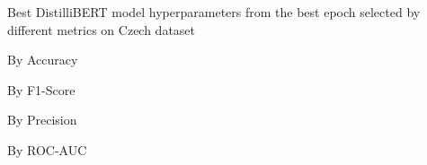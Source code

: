 \begin{table}[!htbp]
    \caption{Best DistilliBERT model hyperparameters from the best epoch selected by different metrics on Czech dataset}
    \label{tab:czech_distillibert_hparams}
    \centering

    \begin{subtable}[t]{0.48\linewidth}
        \scriptsize
        \caption{By Accuracy}
        
    \end{subtable}
    \hfill
    \begin{subtable}[t]{0.48\linewidth}
        \scriptsize
        \caption{By F1-Score}
        
    \end{subtable}

    \vspace{1em}

    \begin{subtable}[t]{0.48\linewidth}
        \scriptsize
        \caption{By Precision}
        
    \end{subtable}
    \hfill
    \begin{subtable}[t]{0.48\linewidth}
        \scriptsize
        \caption{By ROC-AUC}
        
    \end{subtable}


\end{table}